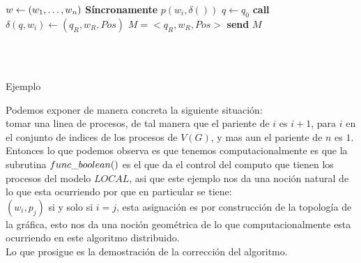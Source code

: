 \documentclass[10pt]{article}
\begin{document}
    \begin{algorithm}
        \begin{algorithmic}
            \STATE $w \gets (w_{1}, \mathellipsis, w_{n})$
            \STATE \textbf{Síncronamente}
                    \STATE $p(w_i,\delta())$
                    \STATE $q \gets q_{0}$
                      \STATE \textbf{call} $\delta(q,w_{i}) \gets (q_{R},w_{R},Pos)$
                    \ENDWHILE
                    \ELSE
                       \STATE $M = <q_{R},w_{R}, Pos>$
                       \STATE \textbf{send} $M$
                    \ENDIF
            \ENDFOR
        \end{algorithmic}
        \caption{$Simulate\char95 Algo \char95 TM(w,G,TM)$\label{lss}}
    \end{algorithm}
    \\\\
    \begin{center}
       Ejemplo
    \end{center}
    Podemos exponer de manera concreta la siguiente situación: \\ tomar una linea de procesos, de tal manera que el pariente de $i$ es $i+1$, para $i$ en el
    conjunto de indices de los procesos de $V(G)$, y mas aun el pariente de $n$ es $1$.\\
    Entonces lo que podemos observa es que tenemos computacionalmente es que la subrutina
    $func \char95 boolean()$ es el que da el control del computo que tienen los procesos del modelo $LOCAL$,
    asi que este ejemplo nos da una noción natural de lo que esta ocurriendo por que en particular se tiene:\\
    $(w_{i},p_{j})$ si y solo si $i=j$, esta asignación es por construcción de la topología de la gráfica,
    esto nos da una noción geométrica de lo que computacionalmente esta ocurriendo en este algoritmo distribuido.
    \\
    Lo que prosigue es la demostración de la corrección del algoritmo.
    \\
\end{document}
